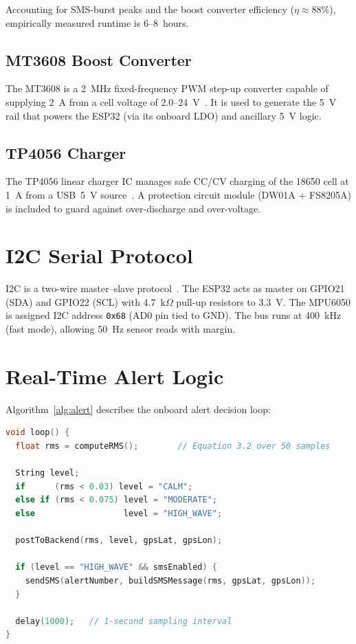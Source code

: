 Accounting for SMS-burst peaks and the boost converter efficiency ($\eta \approx
88\%$), empirically measured runtime is 6--8~hours.

\subsection{MT3608 Boost Converter}

The MT3608 is a 2~MHz fixed-frequency PWM step-up converter capable of supplying
2~A from a cell voltage of 2.0--24~V~\cite{aerosemi2010mt3608}.
It is used to generate the 5~V rail that powers the ESP32 (via its onboard LDO)
and ancillary 5~V logic.

\subsection{TP4056 Charger}

The TP4056 linear charger IC manages safe CC/CV charging of the 18650 cell at 1~A
from a USB~5~V source~\cite{toppower2012tp4056}.
A protection circuit module (DW01A + FS8205A) is included to guard against
over-discharge and over-voltage.

\section{I2C Serial Protocol}

I2C is a two-wire master–slave protocol~\cite{nxp2021i2c}.
The ESP32 acts as master on GPIO21 (SDA) and GPIO22 (SCL) with 4.7~k$\Omega$
pull-up resistors to 3.3~V.
The MPU6050 is assigned I2C address \texttt{0x68} (AD0 pin tied to GND).
The bus runs at 400~kHz (fast mode), allowing 50~Hz sensor reads with margin.

\section{Real-Time Alert Logic}

Algorithm~\ref{alg:alert} describes the onboard alert decision loop:

\begin{lstlisting}[language=C++, caption={WaveGuard V4 Alert Decision Loop (pseudocode)}, label={alg:alert}]
void loop() {
  float rms = computeRMS();        // Equation 3.2 over 50 samples

  String level;
  if      (rms < 0.03) level = "CALM";
  else if (rms < 0.075) level = "MODERATE";
  else                  level = "HIGH_WAVE";

  postToBackend(rms, level, gpsLat, gpsLon);

  if (level == "HIGH_WAVE" && smsEnabled) {
    sendSMS(alertNumber, buildSMSMessage(rms, gpsLat, gpsLon));
  }

  delay(1000);   // 1-second sampling interval
}
\end{lstlisting}
